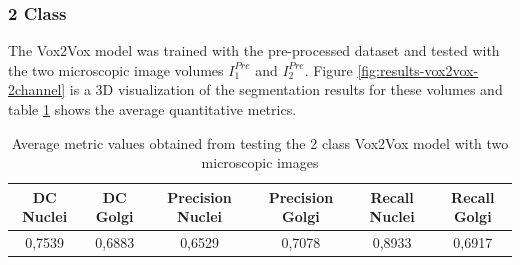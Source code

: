 \subsubsection*{2 Class}

The Vox2Vox model was trained with the pre-processed dataset and tested with the two microscopic image volumes $I^{Pre}_1$ and $I^{Pre}_2$. Figure \ref{fig:results-vox2vox-2channel} is a 3D visualization of the segmentation results for these volumes and table \ref{tab:results-2class-vox2vox} shows the average quantitative metrics. 

\begin{table}[!htb]
\centering
\caption{Average metric values obtained from testing the 2 class Vox2Vox model with two microscopic images}
\label{tab:results-2class-vox2vox}
\renewcommand\arraystretch{1.4}
\begin{tabular}{|c|c|c|c|c|c|}
\hline
DC  Nuclei & DC Golgi & Precision Nuclei & Precision Golgi & Recall Nuclei & Recall Golgi \\ \hline
0,7539     & 0,6883   & 0,6529           & 0,7078          & 0,8933        & 0,6917       \\ \hline
\end{tabular}%

\end{table}

